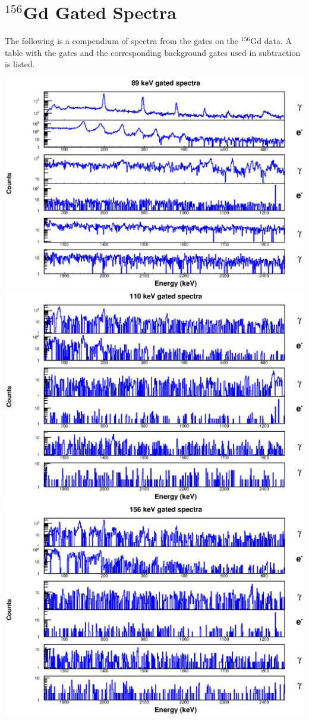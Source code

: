 \chapter{$^{156}$Gd Gated Spectra}

The following is a compendium of spectra from the gates on the $^{156}$Gd data. A table with the gates and the corresponding background gates used in subtraction is listed.

\begin{landscape}
\includegraphics[scale=1.1]{156Gd_Appendix/89_combined.eps}
\includegraphics[scale=1.1]{156Gd_Appendix/110_combined.eps}
\includegraphics[scale=1.1]{156Gd_Appendix/156_combined.eps}

\end{landscape}
